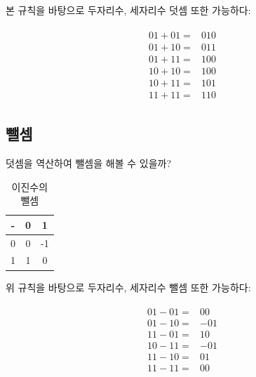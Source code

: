 \documentclass[a4paper,12pt]{book}
\begin{document}
\begin{appendices}
    본 규칙을 바탕으로 두자리수, 세자리수 덧셈 또한 가능하다:

    \begin{align}
    \begin{split}
        01 + 01 =& 010 \\
        01 + 10 =& 011 \\
        01 + 11 =& 100 \\
        10 + 10 =& 100 \\
        10 + 11 =& 101 \\
        11 + 11 =& 110
    \end{split}
    \end{align}


\subsection{뺄셈}
\label{sec:substitution-binary}

    덧셈을 역산하여 뺄셈을 해볼 수 있을까?

    \begin{table}[H]
        \centering

        \caption{이진수의 뺄셈}
        \label{Tab:substitution-binary}

        \begin{tabular}{ || c || c | c || }
            \hline
            - & 0  & 1  \\
            \hline\hline
            0 & 0  & -1 \\
            \hline
            1 & 1  & 0  \\
            \hline
        \end{tabular}
    \end{table}

    위 규칙을 바탕으로 두자리수, 세자리수 뺄셈 또한 가능하다:

    \begin{align}
    \begin{split}
        01 - 01 =& 00 \\
        01 - 10 =& -01 \\
        11 - 01 =& 10 \\
        10 - 11 =& -01 \\
        11 - 10 =& 01 \\
        11 - 11 =& 00
    \end{split}
    \end{align}


\end{appendices}
\end{document}
